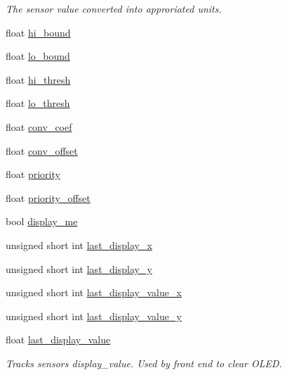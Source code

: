 \begin{DoxyCompactItemize}
\begin{DoxyCompactList}\small\item\em The sensor value converted into approriated units. \end{DoxyCompactList}\item 
float \hyperlink{classSensor_a74860a6d7345801931620a60df08eaab}{hi\+\_\+bound}
\item 
float \hyperlink{classSensor_a911ac4a3ab38cb07cd9452c1cdb1b77e}{lo\+\_\+bound}
\item 
float \hyperlink{classSensor_a66b9a03da7810ac51d8724b250fee747}{hi\+\_\+thresh}
\item 
float \hyperlink{classSensor_a5fea9f7da15f3f88017953b01d944a4b}{lo\+\_\+thresh}
\item 
float \hyperlink{classSensor_a13a675b7eabac15861a4d9a723d3b5ae}{conv\+\_\+coef}
\item 
float \hyperlink{classSensor_a44d7755fab946e33ce35813b9057c910}{conv\+\_\+offset}
\item 
float \hyperlink{classSensor_a8fb814c9040a311ef303cff56b793064}{priority}
\item 
float \hyperlink{classSensor_aa92fdf39b5b6a39e4be505b3006bda02}{priority\+\_\+offset}
\item 
bool \hyperlink{classSensor_ad9b7163e079befb8f3f9af6bdcc0ce21}{display\+\_\+me}
\item 
unsigned short int \hyperlink{classSensor_ad6c53c063c3494cabb8db1db7a73f1c4}{last\+\_\+display\+\_\+x}
\item 
unsigned short int \hyperlink{classSensor_abd9a9623b38fb1b096f8d6d83479a843}{last\+\_\+display\+\_\+y}
\item 
unsigned short int \hyperlink{classSensor_a189156cf6f62b9f94b88a7cb54ad32e5}{last\+\_\+display\+\_\+value\+\_\+x}
\item 
unsigned short int \hyperlink{classSensor_ab92d6ca846f827db0d4e6d6f169a6df5}{last\+\_\+display\+\_\+value\+\_\+y}
\item 
float \hyperlink{classSensor_a0dcb7b0f2e83f31c89be1070cbbc96bb}{last\+\_\+display\+\_\+value}\hypertarget{classSensor_a0dcb7b0f2e83f31c89be1070cbbc96bb}{}\label{classSensor_a0dcb7b0f2e83f31c89be1070cbbc96bb}

\begin{DoxyCompactList}\small\item\em Tracks sensor\textquotesingle{}s display\+\_\+value. Used by front end to clear O\+L\+ED. \end{DoxyCompactList}\end{DoxyCompactItemize}


